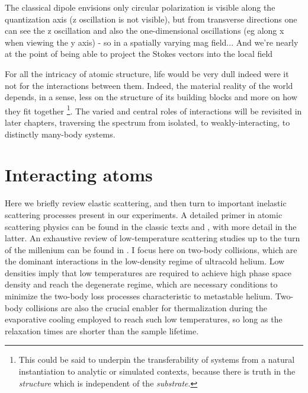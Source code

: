 	

	The classical dipole envisions only circular polarization is visible along the quantization axis (z oscillation is not visible), but from transverse directions one can see the z oscillation and also the one-dimensional oscillations (eg along x when viewing the y axis) - so in a spatially varying mag field...
	And we're nearly at the point of being able to project the Stokes vectors into the local field
	


	
	For all the intricacy of atomic structure, life would be very dull indeed were it not for the interactions between them.
	Indeed, the material reality of the world depends, in a sense, less on the structure of its building blocks and more on how they fit together \footnote{This could be said to underpin the transferability of systems from a natural instantiation to analytic or simulated contexts, because there is truth in the \emph{structure} which is independent of the \emph{substrate}.}.
	The varied and central roles of interactions will be revisited in later chapters, traversing the spectrum from isolated, to weakly-interacting, to distinctly many-body systems.
	


\section{Interacting atoms}

	
	Here we briefly review elastic scattering, and then turn to important inelastic scattering processes present in our experiments.
	A detailed primer in atomic scattering physics can be found in the classic texts \cite{PitaevskiiStringari} and \cite{PethickSmith}, with more detail in the latter.
	An exhaustive review of low-temperature scattering studies up to the turn of the millenium can be found in \cite{weiner99}.
	I focus here on two-body collisions, which are the dominant interactions in the low-density regime of ultracold helium.
	Low densities imply that low temperatures are required to achieve high phase space density and reach the degenerate regime, which are necessary conditions to minimize the two-body loss processes characteristic to metastable helium.
	Two-body collisions are also the crucial enabler for thermalization during the evaporative cooling employed to reach such low temperatures, so long as the relaxation times are shorter than the sample lifetime.

